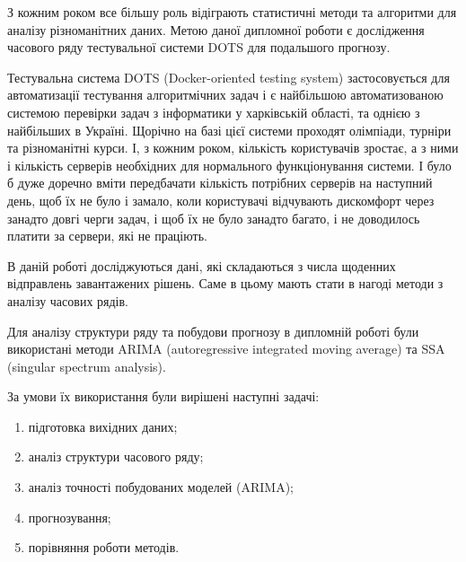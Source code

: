 
\hspace*{26pt} З кожним роком все більшу роль відіграють статистичні методи та алгоритми для аналізу різноманітних даних.
Метою даної дипломної роботи є дослідження часового ряду тестувальної системи DOTS для подальшого прогнозу.

Тестувальна система DOTS (Docker-oriented testing system) застосовується для автоматизації тестування алгоритмічних задач і є найбільшою автоматизованою системою перевірки задач з інформатики у харківській області, та однією з найбільших в Україні. Щорічно на базі цієї системи проходят олімпіади, турніри та різноманітні курси. І, з кожним роком, кількість користувачів зростає, а з ними і кількість серверів необхідних для нормального функціонування системи. І було б дуже доречно вміти передбачати кількість потрібних серверів на наступний день, щоб їх не було і замало, коли користувачі відчувають дискомфорт через занадто довгі черги задач, і щоб їх не було занадто багато, і не доводилось платити за сервери, які не праціють.

В даній роботі досліджуються дані, які складаються з числа щоденних відправлень завантажених рішень.
Саме в цьому мають стати в нагоді методи з аналізу часових рядів.

Для аналізу структури ряду та побудови прогнозу в дипломній роботі були використані методи ARIMA (autoregressive integrated moving average) та SSA (singular spectrum analysis).

За умови їх використання були вирішені наступні задачі:

\begin{enumerate}
	\item підготовка вихідних даних;
	\item аналіз структури часового ряду;
	\item аналіз точності побудованих моделей (ARIMA);
	\item прогнозування;
	\item порівняння роботи методів.
\end{enumerate}

